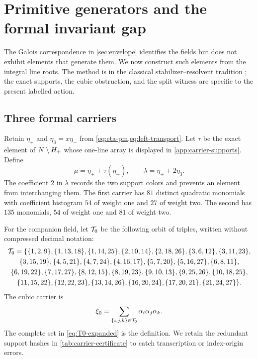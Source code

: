 \section{Primitive generators and the formal invariant gap}
\label{sec:primitive}

The Galois correspondence in \cref{sec:envelope} identifies the fields but
does not exhibit elements that generate them.  We now construct such elements
from the integral line roots.  The method is in the classical
stabilizer--resolvent tradition
\citep{stauduhar1973determination,fiekerklueners2014computation}; the exact
supports, the cubic obstruction, and the split witness are specific to the
present labelled action.

\subsection{Three formal carriers}

Retain $\eta_+$ and $\eta_3=x\eta_-$ from
\cref{eq:eta-pm,eq:left-transport}.  Let $\tau$ be the exact element of
$N\setminus H_{+}$ whose one-line array is displayed in
\cref{app:carrier-supports}.  Define
\begin{equation}
 \mu=\eta_++\tau(\eta_+),
 \qquad
 \lambda=\eta_++2\eta_3.
 \label{eq:mu-lambda}
\end{equation}
The coefficient $2$ in $\lambda$ records the two support colors and prevents
an element from interchanging them.  The first carrier has $81$ distinct
quadratic monomials with coefficient histogram $54$ of weight one and $27$
of weight two.  The second has $135$ monomials, $54$ of weight one and $81$
of weight two.

For the companion field, let $\mathcal{T}_0$ be the following orbit of triples,
written without compressed decimal notation:
\begin{multline}
\mathcal{T}_0=\{\{1,2,9\},\{1,13,18\},\{1,14,25\},\{2,10,14\},
\{2,18,26\},\{3,6,12\},\{3,11,23\},\\
\{3,15,19\},\{4,5,21\},\{4,7,24\},\{4,16,17\},
\{5,7,20\},\{5,16,27\},\{6,8,11\},\\
\{6,19,22\},\{7,17,27\},\{8,12,15\},\{8,19,23\},
\{9,10,13\},\{9,25,26\},\{10,18,25\},\\
\{11,15,22\},\{12,22,23\},\{13,14,26\},\{16,20,24\},
\{17,20,21\},\{21,24,27\}\}.
\label{eq:T0-expanded}
\end{multline}
The cubic carrier is
\begin{equation}
 \xi_0=\sum_{\{i,j,k\}\in\mathcal{T}_0}\alpha_i\alpha_j\alpha_k.
 \label{eq:xi0}
\end{equation}
The complete set in \eqref{eq:T0-expanded} is the definition.  We retain the redundant
support hashes in \cref{tab:carrier-certificate} to catch transcription or
index-origin errors.

